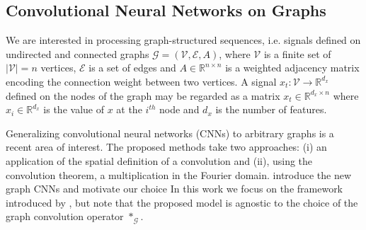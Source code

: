 \documentclass{article} %
\newcommand{\R}{\mathbb{R}}
\newcommand{\G}{\mathcal{G}}
\newcommand{\V}{\mathcal{V}}
\newcommand{\E}{\mathcal{E}}
\newcommand{\todo}[1]{{\color{red} #1 }}
\begin{document}

\subsection{Convolutional Neural Networks on Graphs}

We are interested in processing graph-structured sequences, i.e. signals
defined on undirected and connected graphs $\G=(\V,\E,A)$, where $\V$ is a
finite set of $|\V|=n$ vertices, $\E$ is a set of edges and $A \in \R^{n \times
n}$ is a weighted adjacency matrix encoding the connection weight between two
vertices. A signal $x_t: \V \rightarrow \R^{d_x}$ defined on the nodes of the
graph may be regarded as a matrix $x_t \in \R^{d_x \times n}$ where $x_i \in
\R^{d_x}$ is the value of $x$ at the $i^{th}$ node and $d_x$ is the number of
features.

Generalizing convolutional neural networks (CNNs) to arbitrary graphs is a
recent area of interest. The proposed methods take two approaches: (i) an
application of the spatial definition of a convolution and (ii), using the
convolution theorem, a multiplication in the Fourier domain.
\todo{introduce the new graph CNNs and motivate our choice}
In this work we focus on the framework introduced by \citet{graphcnn}, but note
that the proposed model is agnostic to the choice of the graph convolution
operator $\ast_\G$.
\end{document}
